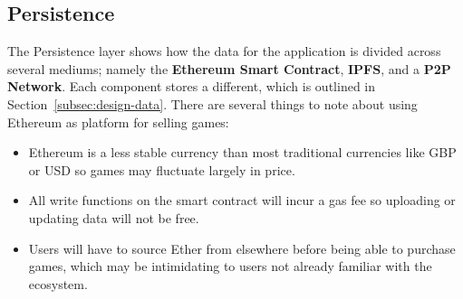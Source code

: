 
\subsection{Persistence}

The Persistence layer shows how the data for the application is divided across several mediums; namely the \textbf{Ethereum Smart Contract}, \textbf{IPFS}, and a \textbf{P2P Network}. Each component stores a different, which is outlined in Section~\ref{subsec:design-data}.
\x
There are several things to note about using Ethereum as platform for selling games:

\begin{itemize}
  \item Ethereum is a less stable currency than most traditional currencies like GBP or USD so games may fluctuate largely in price.
  \item All write functions on the smart contract will incur a gas fee so uploading or updating data will not be free.
  \item Users will have to source Ether from elsewhere before being able to purchase games, which may be intimidating to users not already familiar with the ecosystem.
\end{itemize}
